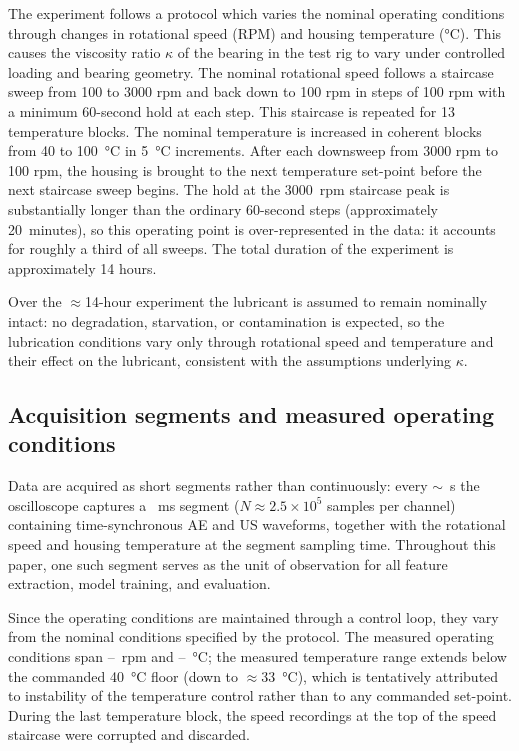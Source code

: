 The experiment follows a protocol which varies the nominal operating conditions through changes in rotational speed (RPM) and housing temperature (\si{\celsius}). This causes the viscosity ratio $\kappa$ of the bearing in the test rig to vary under controlled loading and bearing geometry. The nominal rotational speed follows a staircase sweep from 100 to 3000 rpm and back down to 100 rpm in steps of 100 rpm with a minimum 60-second hold at each step. This staircase is repeated for 13 temperature blocks. The nominal temperature is increased in coherent blocks from 40 to 100~\si{\celsius} in 5~\si{\celsius} increments. After each downsweep from 3000 rpm to 100 rpm, the housing is brought to the next temperature set-point before the next staircase sweep begins. The hold at the \SI{3000}{rpm} staircase peak is substantially longer than the ordinary 60-second steps (approximately 20~minutes), so this operating point is over-represented in the data: it accounts for roughly a third of all sweeps. The total duration of the experiment is approximately 14 hours.

Over the $\approx$14-hour experiment the lubricant is assumed to remain
nominally intact: no degradation, starvation, or contamination is expected,
so the lubrication conditions vary only through rotational speed and
temperature and their effect on the lubricant, consistent with the
assumptions underlying $\kappa$.


\subsection{Acquisition segments and measured operating conditions}
Data are acquired as short segments rather than continuously: every $\sim$\resWindowIntervalS~s the oscilloscope captures a \resWindowMs~ms segment
($N \approx 2.5 \times 10^{5}$ samples per channel)  containing time-synchronous AE and US waveforms, together with the rotational speed and housing temperature at the segment sampling time. Throughout this paper, one such segment serves as the unit of observation for all feature extraction, model training, and evaluation.

Since the operating conditions are maintained through a control loop, they vary from the nominal conditions specified by the protocol. The measured operating conditions span \resRpmMinMeas--\resRpmMaxMeas~rpm and \resTempMinMeas--\resTempMaxMeas~\si{\celsius}; the measured temperature range extends below the commanded \SI{40}{\celsius} floor (down to $\approx$\SI{33}{\celsius}), which is tentatively attributed to instability of the temperature control rather than to any commanded set-point. During the last temperature block, the speed recordings at the top of the speed staircase were corrupted and discarded.

